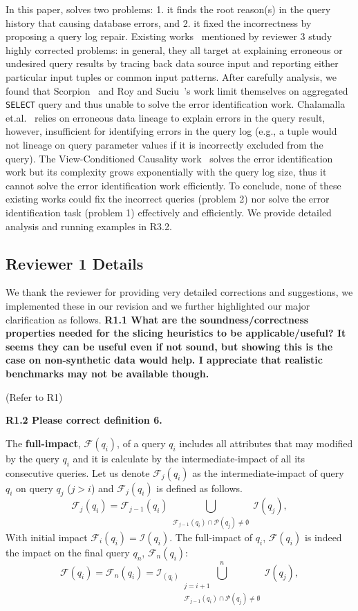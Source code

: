 In this paper, \sys solves two problems: 1. it finds the root reason(s) in the query history that causing database errors, and 2. it fixed the incorrectness by proposing a query log repair. Existing works~\cite{Wu13, roy2014formal, chalamalla2014,meliou2011tracing} mentioned by reviewer 3 study highly corrected problems: in general, they all target at explaining erroneous or undesired query results by tracing back data source input and reporting either particular input tuples or common input patterns. After carefully analysis, we 
found that Scorpion~\cite{Wu13} and Roy and Suciu~\cite{roy2014formal}'s work limit themselves on aggregated \texttt{SELECT} query and thus unable to solve the error identification work. Chalamalla et.al.~\cite{chalamalla2014} relies on erroneous data lineage to explain errors in the query result, however, insufficient for identifying errors in the query log (e.g., a tuple would not lineage on query parameter values if it is incorrectly excluded from the query). The View-Conditioned Causality work~\cite{meliou2011tracing} solves the error identification work but its complexity grows exponentially with the query log size, thus it cannot solve the error identification work efficiently. To conclude,
none of these existing works could fix the incorrect queries (problem 2) nor solve the error identification task (problem 1) effectively and efficiently. We provide detailed analysis and running examples in R3.2. 


\subsection*{Reviewer 1 Details}
We thank the reviewer for providing very detailed corrections and suggestions, we implemented these in our revision and we further highlighted our major clarification as follows.
\noindent \textbf{R1.1 What are the soundness/correctness properties needed for the slicing heuristics to be applicable/useful? It seems they can be useful even if not sound, but showing this is the case on non-synthetic data would help. I appreciate that realistic benchmarks may not be available though.}

(Refer to R1)

\noindent \textbf{R1.2 Please correct definition 6.} 

The \textbf{full-impact}, $\mathcal{F}(q_i)$, of a query $q_i$ includes all attributes that may modified by the query $q_i$ and it is calculate by the intermediate-impact of all its consecutive queries. Let us denote $\mathcal{F}_j(q_i)$ as the intermediate-impact of query $q_i$ on query $q_j$ ($j > i$) and $\mathcal{F}_j(q_i)$ is defined as follows.
 \[
    \mathcal{F}_j(q_i)=\mathcal{F}_{j-1}(q_i)\bigcup_{\substack{\mathcal{F}_{j-1}(q_i)\cap \mathcal{P}(q_j) \neq \emptyset}} \mathcal{I}(q_j),
 \]
With initial impact $\mathcal{F}_i(q_i)  = \mathcal{I}(q_i)$. The full-impact of $q_i$, $\mathcal{F}(q_i)$ is indeed the impact on the final query $q_n$, $\mathcal{F}_n(q_i)$:
\[
	\mathcal{F}(q_i)=\mathcal{F}_n(q_i) = \mathcal{I}_(q_i)\bigcup_{\substack{j = i+1 \\ \mathcal{F}_{j-1}(q_i)\cap \mathcal{P}(q_j) \neq \emptyset}}^n \mathcal{I}(q_j),
\] 

